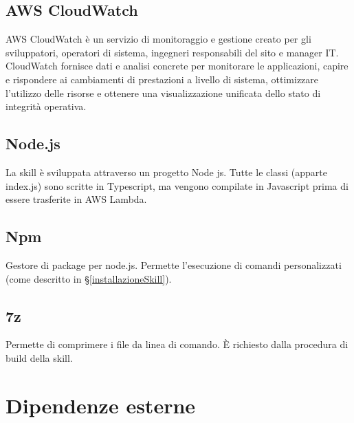 \subsection{AWS CloudWatch}
AWS CloudWatch è un servizio di monitoraggio e gestione creato per gli sviluppatori, operatori di sistema, ingegneri responsabili del sito e manager IT. CloudWatch fornisce dati e analisi concrete per monitorare le applicazioni, capire e rispondere ai cambiamenti di prestazioni a livello di sistema, ottimizzare l'utilizzo delle risorse e ottenere una visualizzazione unificata dello stato di integrità operativa. 
\subsection{Node.js}
La skill è sviluppata attraverso un progetto Node js. Tutte le classi (apparte index.js) sono scritte in Typescript, ma vengono compilate in Javascript prima di essere trasferite in AWS Lambda.
\subsection{Npm}
Gestore di package per node.js. Permette l'esecuzione di comandi personalizzati (come descritto in \S\ref{installazioneSkill}).
\subsection{7z}
Permette di comprimere i file da linea di comando. \`{E} richiesto dalla procedura di build della skill.

\section{Dipendenze esterne}

